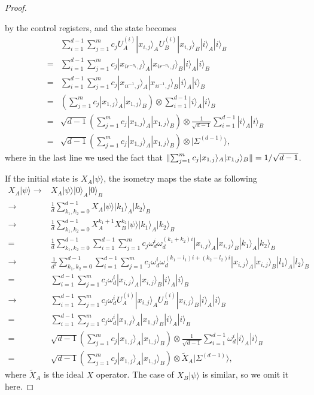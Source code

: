 \documentclass[11pt,letterpaper]{article}
\newcommand{\ket}[1]{|#1\rangle}
\newcommand{\x}{\otimes}
\DeclarePairedDelimiter{\norm}{\lVert}{\rVert}
\newcommand{\1}{\mathbb{1}}
\newcommand{\EPR}[1]{\Sigma^{(#1)}}
\newcommand{\tX}{\tilde{X}}
\theoremstyle{definition}
\begin{document}
\begin{proof}
\begin{enumerate}
	by the control registers, and the state becomes
	\begin{align}
		&\sum_{i=1}^{d-1}\sum_{j=1}^m c_j U_A^{(i)}\ket{x_{i,j}}_A U_B^{(i)}\ket{x_{i,j}}_B \ket{i}_A\ket{i}_B \\
		=&\sum_{i=1}^{d-1} \sum_{j=1}^m c_j \ket{x_{i r^{-n_i} ,j}}_A \ket{x_{i r^{-n_i},j}}_B \ket{i}_A\ket{i}_B\\
		=& \sum_{i=1}^{d-1} \sum_{j=1}^m c_j \ket{x_{i i^{-1},j}}_A \ket{x_{i i^{-1},j}}_B \ket{i}_A\ket{i}_B\\
		= &\left(\sum_{j=1}^m c_j \ket{x_{1,j}}_A \ket{x_{1,j}}_B\right) \x \sum_{i=1}^{d-1} \ket{i}_A\ket{i}_B\\
		=&\sqrt{d-1} \left(\sum_{j=1}^m c_j \ket{x_{1,j}}_A \ket{x_{1,j}}_B\right) \x 
		\frac{1}{\sqrt{d-1}}\sum_{i=1}^{d-1}\ket{i}_A\ket{i}_B\\
		=&\sqrt{d-1} \left(\sum_{j=1}^m c_j \ket{x_{1,j}}_A \ket{x_{1,j}}_B\right) \x \ket{\EPR{d-1}},
	\end{align}
	where in the last line we used the fact that $\norm{\sum_{j=1}^m c_j \ket{x_{1,j}}_A \ket{x_{1,j}}_B} = 1/\sqrt{d-1}$.
\end{enumerate}

If the initial state is $X_A\ket{\psi}$, the isometry maps the state as following
\begin{align}
	X_A\ket{\psi} \to &X_A\ket{\psi}\ket{0}_A\ket{0}_B\\
	\to &\frac{1}{d} \sum_{k_1,k_2 =0}^{d-1} X_A\ket{\psi} \ket{k_1}_A \ket{k_2}_B \\
	\to &\frac{1}{d} \sum_{k_1,k_2 =0}^{d-1} X_A^{k_1+1} X_B^{k_2}\ket{\psi} \ket{k_1}_A \ket{k_2}_B \\
	=&\frac{1}{d} \sum_{k_1,k_2 =0}^{d-1} \sum_{i=1}^{d-1}\sum_{j=1}^m c_j \omega_d^i\omega_d^{(k_1+k_2)i} \ket{x_{i,j}}_A\ket{x_{i,j}}_B
		\ket{k_1}_A \ket{k_2}_B\\
	\to &\frac{1}{d^2}\sum_{k_1,k_2 =0}^{d-1} \sum_{i=1}^{d-1}\sum_{j=1}^m c_j \omega_d^i\omega_d^{(k_1-l_1)i+(k_2-l_2)i} \ket{x_{i,j}}_A\ket{x_{i,j}}_B
		\ket{l_1}_A \ket{l_2}_B\\
	=&\sum_{i=1}^{d-1}\sum_{j=1}^m c_j \omega_d^i \ket{x_{i,j}}_A\ket{x_{i,j}}_B \ket{i}_A \ket{i}_B\\
	\to& \sum_{i=1}^{d-1}\sum_{j=1}^m c_j \omega_d^i U_A^{(i)}\ket{x_{i,j}}_A U_B^{(i)}\ket{x_{i,j}}_B \ket{i}_A\ket{i}_B\\
	=&\sum_{i=1}^{d-1}\sum_{j=1}^m c_j \omega_d^i \ket{x_{1,j}}_A \ket{x_{1,j}}_B \ket{i}_A\ket{i}_B\\
	=&\sqrt{d-1} \left(\sum_{j=1}^m c_j \ket{x_{1,j}}_A \ket{x_{1,j}}_B\right) \x 
		\frac{1}{\sqrt{d-1}} \sum_{i=1}^{d-1}\omega_d^i \ket{i}_A\ket{i}_B\\
	=& \sqrt{d-1} \left(\sum_{j=1}^m c_j \ket{x_{1,j}}_A \ket{x_{1,j}}_B\right) \x \tX_A \ket{\EPR{d-1}},
\end{align}
where $\tX_A$ is the ideal $X$ operator.
The case of $X_B\ket{\psi}$ is similar, so we omit it here. 


\end{proof}
\end{document}

